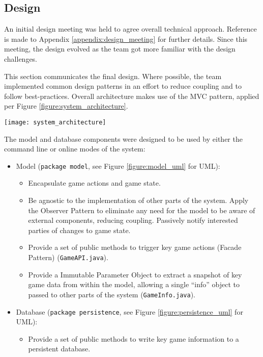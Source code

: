 \subsection{Design}

An initial design meeting was held to agree overall technical approach.
Reference is made to Appendix \ref{appendix:design_meeting} for further details.
Since this meeting, the design evolved as the team got more familiar with the design challenges.

This section communicates the final design.
Where possible, the team implemented common design patterns in an effort to reduce coupling and to follow best-practices.
Overall architecture makes use of the MVC pattern, applied per Figure \ref{figure:system_architecture}.

\begin{center}
	\texttt{[image: system\_architecture]}
	\label{figure:system_architecture}
\end{center}

The model and database components were designed to be used by either the command line or online modes of the system:

\begin{itemize}
	\item Model (\texttt{package model}, see Figure \ref{figure:model_uml} for UML):
	\begin{itemize}
		\item Encapsulate game actions and game state.
		\item Be agnostic to the implementation of other parts of the system. Apply the Observer Pattern to eliminate any need for the model to be aware of external components, reducing coupling. Passively notify interested parties of changes to game state.
		\item Provide a set of public methods to trigger key game actions (Facade Pattern) (\texttt{GameAPI.java}).
		\item Provide a Immutable Parameter Object to extract a snapshot of key game data from within the model, allowing a single ``info'' object to passed to other parts of the system (\texttt{GameInfo.java}).
	\end{itemize}

	\item Database (\texttt{package persistence}, see Figure \ref{figure:persistence_uml} for UML):
	\begin{itemize}
		\item Provide a set of public methods to write key game information to a persistent database.
	\end{itemize}
\end{itemize}

